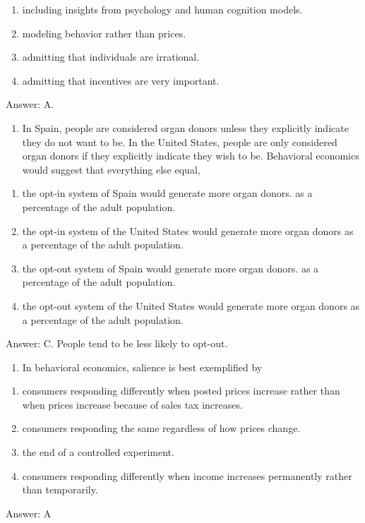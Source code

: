 \documentclass[11pt,]{article}
\providecommand{\tightlist}{%
  \setlength{\itemsep}{0pt}\setlength{\parskip}{0pt}}
\begin{document}
\begin{enumerate}
\def\labelenumi{\Alph{enumi})}
\tightlist
\item
  including insights from psychology and human cognition models.
\item
  modeling behavior rather than prices.
\item
  admitting that individuals are irrational.
\item
  admitting that incentives are very important.
\end{enumerate}

Answer: A.

\begin{enumerate}
\def\labelenumi{\arabic{enumi})}
\setcounter{enumi}{18}
\tightlist
\item
  In Spain, people are considered organ donors unless they explicitly
  indicate they do not want to be. In the United States, people are only
  considered organ donors if they explicitly indicate they wish to be.
  Behavioral economics would suggest that everything else equal,
\end{enumerate}

\begin{enumerate}
\def\labelenumi{\Alph{enumi})}
\tightlist
\item
  the opt-in system of Spain would generate more organ donors. as a
  percentage of the adult population.
\item
  the opt-in system of the United States would generate more organ
  donors as a percentage of the adult population.
\item
  the opt-out system of Spain would generate more organ donors. as a
  percentage of the adult population.
\item
  the opt-out system of the United States would generate more organ
  donors as a percentage of the adult population.
\end{enumerate}

Answer: C. People tend to be less likely to opt-out.

\begin{enumerate}
\def\labelenumi{\arabic{enumi})}
\setcounter{enumi}{19}
\tightlist
\item
  In behavioral economics, salience is best exemplified by
\end{enumerate}

\begin{enumerate}
\def\labelenumi{\Alph{enumi})}
\tightlist
\item
  consumers responding differently when posted prices increase rather
  than when prices increase because of sales tax increases.
\item
  consumers responding the same regardless of how prices change.
\item
  the end of a controlled experiment.
\item
  consumers responding differently when income increases permanently
  rather than temporarily.
\end{enumerate}

Answer: A
\end{document}
